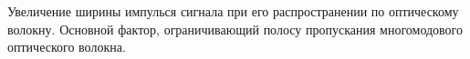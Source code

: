 Увеличение ширины импулься сигнала при его распространении
по оптическому волокну. Основной фактор, ограничивающий полосу
пропускания многомодового оптического волокна.